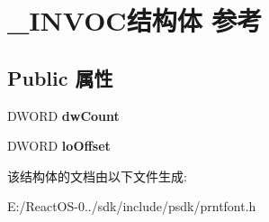\hypertarget{struct___i_n_v_o_c}{}\section{\+\_\+\+I\+N\+V\+O\+C结构体 参考}
\label{struct___i_n_v_o_c}
\subsection*{Public 属性}
\begin{DoxyCompactItemize}
\item 
\mbox{\label{struct___i_n_v_o_c_a91194cee9f85772dac2de774c5baf5d2}} 
D\+W\+O\+RD {\bfseries dw\+Count}
\item 
\mbox{\label{struct___i_n_v_o_c_a44514c8fbc9f47e85c8bff79c43075ed}} 
D\+W\+O\+RD {\bfseries lo\+Offset}
\end{DoxyCompactItemize}


该结构体的文档由以下文件生成\+:\begin{DoxyCompactItemize}
\item 
E\+:/\+React\+O\+S-\/0../sdk/include/psdk/prntfont.\+h\end{DoxyCompactItemize}
